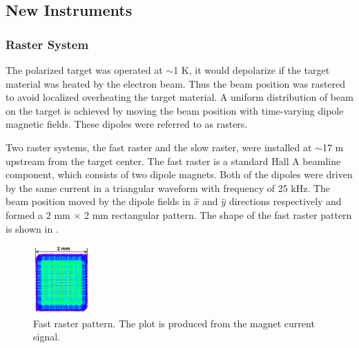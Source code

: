 \subsection{New Instruments}
\label{C5S2SS5}

\subsubsection{Raster System}

The polarized target was operated at $\sim$1 K, it would depolarize if the target material was heated by the electron beam. Thus the beam position was rastered to avoid localized overheating the target material. A uniform distribution of beam on the target is achieved by moving the beam position with time-varying dipole magnetic fields. These dipoles were referred to as rasters.

Two raster systems, the fast raster and the slow raster, were installed at $\sim$17 m upstream from the target center. The fast raster is a standard Hall A beamline component, which consists of two dipole magnets. Both of the dipoles were driven by the same current in a triangular waveform with frequency of 25 kHz. The beam position moved by the dipole fields in $\hat{x}$ and $\hat{y}$ directions respectively and formed a 2 mm $\times$ 2 mm rectangular pattern. The shape of the fast raster pattern is shown in .

\begin{figure}[b!]
  \centering
  \includegraphics[width=0.2\textwidth]{figs/fast-raster-pattern.png}
  \caption[Fast raster pattern.]{Fast raster pattern. The plot is produced from the magnet current signal. \label{C5S2SS5F1}}
\end{figure}

